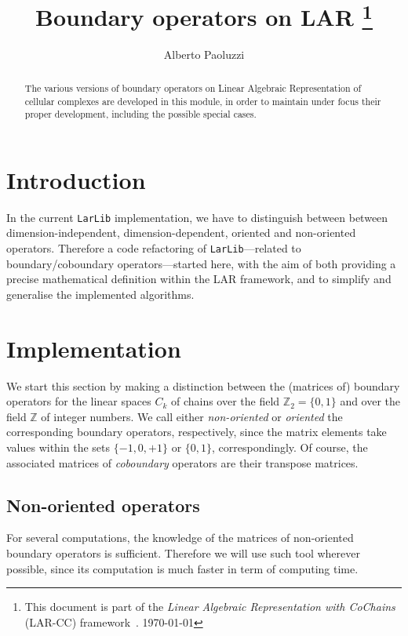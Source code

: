 \documentclass[11pt,oneside]{article}    %
\title{Boundary operators on LAR
\footnote{This document is part of the \emph{Linear Algebraic Representation with CoChains} (LAR-CC) framework~\cite{cclar-proj:2013:00}. \today}
}
\author{Alberto Paoluzzi}
\def\Z{\mathbb{Z}}
\begin{document}
\maketitle
\nonstopmode

\begin{abstract}
The various versions of boundary operators on Linear Algebraic Representation of cellular complexes are  developed in this module, in order to maintain under focus their proper development, including the possible special cases.
\end{abstract}

\tableofcontents
\newpage

\section{Introduction}

In the current \texttt{LarLib} implementation, we have to distinguish between between dimension-independent, dimension-dependent, oriented and non-oriented operators.
Therefore a code refactoring of \texttt{LarLib}---related to boundary/coboundary operators---started here, with the aim of both providing a precise mathematical definition within the LAR framework, and to simplify and generalise the implemented algorithms.


\section{Implementation}

We start this section by making a distinction between the (matrices of) boundary operators for the linear spaces $C_k$ of chains over the field $\Z_2 = \{0,1\}$ and over the field $\Z$ of integer numbers.
We call either \emph{non-oriented} or \emph{oriented} the corresponding boundary operators, respectively, since the matrix elements take values within the sets $\{-1,0,+1\}$ or $\{0,1\}$, correspondingly.
Of course, the associated matrices of \emph{coboundary} operators are their transpose matrices.


\subsection{Non-oriented operators}

For several computations, the knowledge of the matrices of non-oriented boundary operators is sufficient. 
Therefore we will use such tool wherever possible, since its computation is much faster in term of computing time. 
\end{document}
